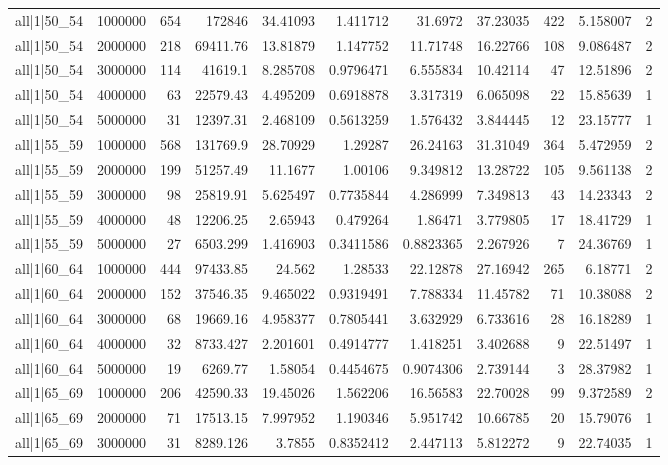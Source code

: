 \begin{tabular}{lrrrrrrrrrr}
all|1|50\_54 & 1000000 & 654 & 172846 & 34.41093 & 1.411712 & 31.6972 & 37.23035 & 422 & 5.158007 & 2 \\
all|1|50\_54 & 2000000 & 218 & 69411.76 & 13.81879 & 1.147752 & 11.71748 & 16.22766 & 108 & 9.086487 & 2 \\
all|1|50\_54 & 3000000 & 114 & 41619.1 & 8.285708 & 0.9796471 & 6.555834 & 10.42114 & 47 & 12.51896 & 2 \\
all|1|50\_54 & 4000000 & 63 & 22579.43 & 4.495209 & 0.6918878 & 3.317319 & 6.065098 & 22 & 15.85639 & 1 \\
all|1|50\_54 & 5000000 & 31 & 12397.31 & 2.468109 & 0.5613259 & 1.576432 & 3.844445 & 12 & 23.15777 & 1 \\
all|1|55\_59 & 1000000 & 568 & 131769.9 & 28.70929 & 1.29287 & 26.24163 & 31.31049 & 364 & 5.472959 & 2 \\
all|1|55\_59 & 2000000 & 199 & 51257.49 & 11.1677 & 1.00106 & 9.349812 & 13.28722 & 105 & 9.561138 & 2 \\
all|1|55\_59 & 3000000 & 98 & 25819.91 & 5.625497 & 0.7735844 & 4.286999 & 7.349813 & 43 & 14.23343 & 2 \\
all|1|55\_59 & 4000000 & 48 & 12206.25 & 2.65943 & 0.479264 & 1.86471 & 3.779805 & 17 & 18.41729 & 1 \\
all|1|55\_59 & 5000000 & 27 & 6503.299 & 1.416903 & 0.3411586 & 0.8823365 & 2.267926 & 7 & 24.36769 & 1 \\
all|1|60\_64 & 1000000 & 444 & 97433.85 & 24.562 & 1.28533 & 22.12878 & 27.16942 & 265 & 6.18771 & 2 \\
all|1|60\_64 & 2000000 & 152 & 37546.35 & 9.465022 & 0.9319491 & 7.788334 & 11.45782 & 71 & 10.38088 & 2 \\
all|1|60\_64 & 3000000 & 68 & 19669.16 & 4.958377 & 0.7805441 & 3.632929 & 6.733616 & 28 & 16.18289 & 1 \\
all|1|60\_64 & 4000000 & 32 & 8733.427 & 2.201601 & 0.4914777 & 1.418251 & 3.402688 & 9 & 22.51497 & 1 \\
all|1|60\_64 & 5000000 & 19 & 6269.77 & 1.58054 & 0.4454675 & 0.9074306 & 2.739144 & 3 & 28.37982 & 1 \\
all|1|65\_69 & 1000000 & 206 & 42590.33 & 19.45026 & 1.562206 & 16.56583 & 22.70028 & 99 & 9.372589 & 2 \\
all|1|65\_69 & 2000000 & 71 & 17513.15 & 7.997952 & 1.190346 & 5.951742 & 10.66785 & 20 & 15.79076 & 1 \\
all|1|65\_69 & 3000000 & 31 & 8289.126 & 3.7855 & 0.8352412 & 2.447113 & 5.812272 & 9 & 22.74035 & 1 \\

\end{tabular}
